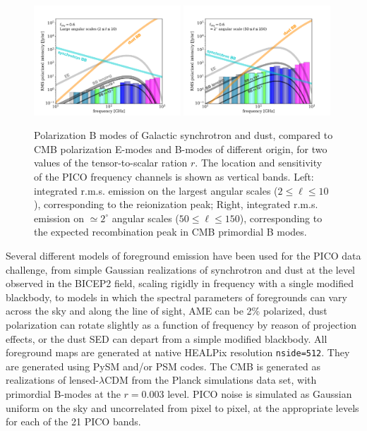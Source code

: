\documentclass[PICOReport.tex]{subfiles}
\begin{document}
\begin{figure}
\includegraphics[width=0.49\textwidth,angle=0]{images/sensitivity_vs_frequency_Jun29th_2018_large.pdf}
\includegraphics[width=0.49\textwidth,angle=0]{images/sensitivity_vs_frequency_Jun29th_2018_2deg.pdf}
\caption{Polarization B modes of Galactic synchrotron and dust, compared to CMB polarization E-modes and B-modes of different origin, for two values of the tensor-to-scalar ration $r$. The location and sensitivity of the PICO frequency channels is shown as vertical bands. Left: integrated r.m.s. emission on the largest angular scales ($2\leq \ell \leq 10$), corresponding to the reionization peak; Right, integrated r.m.s. emission on $\simeq 2^\circ$ angular scales ($50 \leq \ell \leq 150$), corresponding to the expected recombination peak in CMB primordial B modes.}
\label{fig:pico-channels-and-fg}
\end{figure}


Several different models of foreground emission have been used for the PICO data challenge, from simple Gaussian realizations of synchrotron and dust at the level observed in the BICEP2 field, scaling rigidly in frequency with a single modified blackbody, to models in which the spectral parameters of foregrounds can vary across the sky and along the line of sight, AME can be 2\% polarized, dust polarization can rotate slightly as a function of frequency by reason of projection effects, or the dust SED can depart from a simple modified blackbody. All foreground maps are generated at native HEALPix resolution {\tt nside=512}. They are generated using PySM and/or PSM codes.
%
The CMB is generated as realizations of lensed-$\lambda$CDM from the Planck simulations data set, with primordial B-modes at the $r=0.003$ level. PICO noise is simulated as Gaussian uniform on the sky and uncorrelated from pixel to pixel, at the appropriate levels for each of the 21 PICO bands. 
\end{document}

